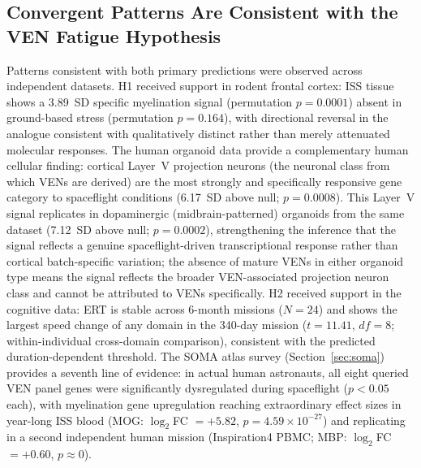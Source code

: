 \documentclass[11pt]{article}
\begin{document}
\subsection{Convergent Patterns Are Consistent with the VEN Fatigue
Hypothesis}

Patterns consistent with both primary predictions were observed across
independent datasets.
H1 received support in rodent frontal cortex: ISS tissue shows a 3.89~SD
specific myelination signal (permutation $p=0.0001$) absent in
ground-based stress (permutation $p=0.164$), with directional reversal in
the analogue consistent with qualitatively distinct rather than merely
attenuated molecular responses.
The human organoid data provide a complementary human cellular finding:
cortical Layer~V projection neurons (the neuronal class from which VENs
are derived) are the most strongly and specifically responsive gene
category to spaceflight conditions (6.17~SD above null; $p=0.0008$).
This Layer~V signal replicates in dopaminergic (midbrain-patterned)
organoids from the same dataset (7.12~SD above null; $p=0.0002$),
strengthening the inference that the signal reflects a genuine
spaceflight-driven transcriptional response rather than cortical
batch-specific variation; the absence of mature VENs in either organoid
type means the signal reflects the broader VEN-associated projection
neuron class and cannot be attributed to VENs specifically.
H2 received support in the cognitive data: ERT is stable across 6-month
missions ($N=24$) and shows the largest speed change of any domain in the
340-day mission ($t=11.41$, $df=8$; within-individual cross-domain
comparison), consistent with the predicted duration-dependent threshold.
The SOMA atlas survey (Section~\ref{sec:soma}) provides a seventh line of
evidence: in actual human astronauts, all eight queried VEN panel genes
were significantly dysregulated during spaceflight ($p < 0.05$ each),
with myelination gene upregulation reaching extraordinary effect sizes in
year-long ISS blood (MOG: $\log_2$FC $= +5.82$, $p = 4.59 \times 10^{-27}$)
and replicating in a second independent human mission (Inspiration4 PBMC;
MBP: $\log_2$FC $= +0.60$, $p \approx 0$).
\end{document}
